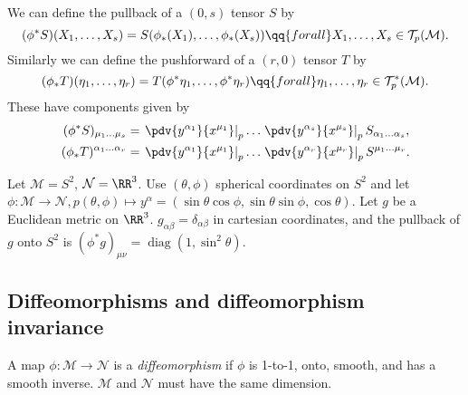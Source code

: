 \documentclass{jknotes}
\begin{document}
We can define the pullback of a \((0,s)\) tensor \(S\) by
\begin{equation}
    (\phi^*S)(X_1,\dots,X_s) = S(\phi_*(X_1),\dots,\phi_*(X_s)) \qq{for all} X_1,\dots,X_s \in \mathcal{T}_p(\mathcal{M}).
\end{equation}
Similarly we can define the pushforward of a \((r,0)\) tensor \(T\) by
\begin{equation}
    (\phi_*T)(\eta_1,\dots,\eta_r) = T(\phi^*\eta_1,\dots,\phi^*\eta_r) \qq{for all} \eta_1,\dots,\eta_r \in \mathcal{T}_p^*(\mathcal{M}).
\end{equation}
These have components given by
\begin{align}
    (\phi^*S)_{\mu_1\dots\mu_s} &= \left.\pdv{y^{\alpha_1}}{x^{\mu_1}}\right|_p\dots\left.\pdv{y^{\alpha_s}}{x^{\mu_s}}\right|_p S_{\alpha_1\dots\alpha_s}, \\
    (\phi_*T)^{\alpha_1\dots\alpha_r} &= \left.\pdv{y^{\alpha_1}}{x^{\mu_1}}\right|_p\dots\left.\pdv{y^{\alpha_r}}{x^{\mu_r}}\right|_p S^{\mu_1\dots\mu_r}.
\end{align}

\begin{eg}
    Let \(\mathcal{M} = S^2\), \(\mathcal{N} = \RR^3\). Use \((\theta,\phi)\) spherical coordinates on \(S^2\) and let \(\phi:\mathcal{M}\to\mathcal{N},p(\theta,\phi)\mapsto y^\alpha = (\sin\theta\cos\phi,\sin\theta\sin\phi,\cos\theta)\). Let \(g\) be a Euclidean metric on \(\RR^3\). \(g_{\alpha\beta} = \delta_{\alpha\beta}\) in cartesian coordinates, and the pullback of \(g\) onto \(S^2\) is \((\phi^*g)_{\mu\nu} = \operatorname{diag}(1,\sin^2\theta)\).
\end{eg}

\subsection{Diffeomorphisms and diffeomorphism invariance}

\begin{defn}
    A map \(\phi:\mathcal{M}\to\mathcal{N}\) is a \emph{diffeomorphism} if \(\phi\) is 1-to-1, onto, smooth, and has a smooth inverse. \(\mathcal{M}\) and \(\mathcal{N}\) must have the same dimension.
\end{defn}
\end{document}

